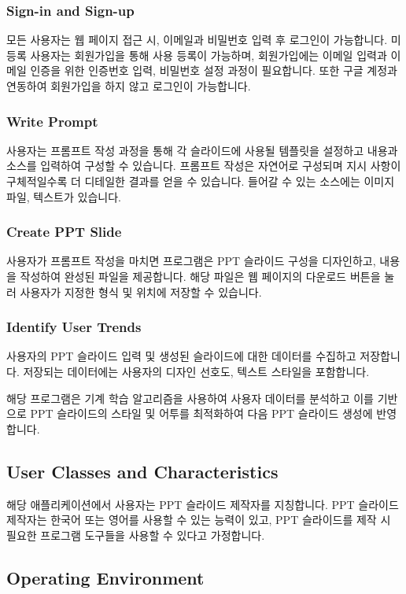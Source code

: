 \documentclass[a4paper, 12pt]{article}
\begin{document}
\subsubsection{Sign-in and Sign-up}
모든 사용자는 웹 페이지 접근 시, 이메일과 비밀번호 입력 후 로그인이 가능합니다. 미등록 사용자는 회원가입을 통해 사용 등록이 가능하며, 회원가입에는 이메일 입력과 이메일 인증을 위한 인증번호 입력, 비밀번호 설정 과정이 필요합니다. 또한 구글 계정과 연동하여 회원가입을 하지 않고 로그인이 가능합니다.

\subsubsection{Write Prompt}
사용자는 프롬프트 작성 과정을 통해 각 슬라이드에 사용될 템플릿을 설정하고 내용과 소스를 입력하여 구성할 수 있습니다. 프롬프트 작성은 자연어로 구성되며 지시 사항이 구체적일수록 더 디테일한 결과를 얻을 수 있습니다. 들어갈 수 있는 소스에는 이미지 파일, 텍스트가 있습니다.

\subsubsection{Create PPT Slide}
사용자가 프롬프트 작성을 마치면 프로그램은 PPT 슬라이드 구성을 디자인하고, 내용을 작성하여 완성된 파일을 제공합니다. 해당 파일은 웹 페이지의 다운로드 버튼을 눌러 사용자가 지정한 형식 및 위치에 저장할 수 있습니다.

\subsubsection{Identify User Trends}
사용자의 PPT 슬라이드 입력 및 생성된 슬라이드에 대한 데이터를 수집하고 저장합니다. 저장되는 데이터에는 사용자의 디자인 선호도, 텍스트 스타일을 포함합니다.

해당 프로그램은 기계 학습 알고리즘을 사용하여 사용자 데이터를 분석하고 이를 기반으로 PPT 슬라이드의 스타일 및 어투를 최적화하여 다음 PPT 슬라이드 생성에 반영합니다.
\subsection{User Classes and Characteristics}
해당 애플리케이션에서 사용자는 PPT 슬라이드 제작자를 지칭합니다. PPT 슬라이드 제작자는 한국어 또는 영어를 사용할 수 있는 능력이 있고, PPT 슬라이드를 제작 시 필요한 프로그램 도구들을 사용할 수 있다고 가정합니다.
\subsection{Operating Environment}
\end{document}
